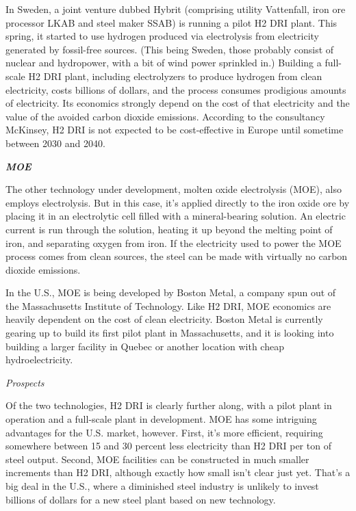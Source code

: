 \documentclass[
]{book}
\begin{document}
In Sweden, a joint venture dubbed Hybrit (comprising utility Vattenfall, iron ore processor LKAB and steel maker SSAB) is running a pilot H2 DRI plant. This spring, it started to use hydrogen produced via electrolysis from electricity generated by fossil-free sources. (This being Sweden, those probably consist of nuclear and hydropower, with a bit of wind power sprinkled in.) Building a full-scale H2 DRI plant, including electrolyzers to produce hydrogen from clean electricity, costs billions of dollars, and the process consumes prodigious amounts of electricity. Its economics strongly depend on the cost of that electricity and the value of the avoided carbon dioxide emissions. According to the consultancy McKinsey, H2 DRI is not expected to be cost-effective in Europe until sometime between 2030 and 2040.

\textbf{\emph{MOE}}

The other technology under development, molten oxide electrolysis (MOE), also employs electrolysis. But in this case, it's applied directly to the iron oxide ore by placing it in an electrolytic cell filled with a mineral-bearing solution. An electric current is run through the solution, heating it up beyond the melting point of iron, and separating oxygen from iron. If the electricity used to power the MOE process comes from clean sources, the steel can be made with virtually no carbon dioxide emissions.

In the U.S., MOE is being developed by Boston Metal, a company spun out of the Massachusetts Institute of Technology. Like H2 DRI, MOE economics are heavily dependent on the cost of clean electricity. Boston Metal is currently gearing up to build its first pilot plant in Massachusetts, and it is looking into building a larger facility in Quebec or another location with cheap hydroelectricity.

\emph{Prospects}

Of the two technologies, H2 DRI is clearly further along, with a pilot plant in operation and a full-scale plant in development. MOE has some intriguing advantages for the U.S. market, however. First, it's more efficient, requiring somewhere between 15 and 30 percent less electricity than H2 DRI per ton of steel output. Second, MOE facilities can be constructed in much smaller increments than H2 DRI, although exactly how small isn't clear just yet. That's a big deal in the U.S., where a diminished steel industry is unlikely to invest billions of dollars for a new steel plant based on new technology.
\end{document}
